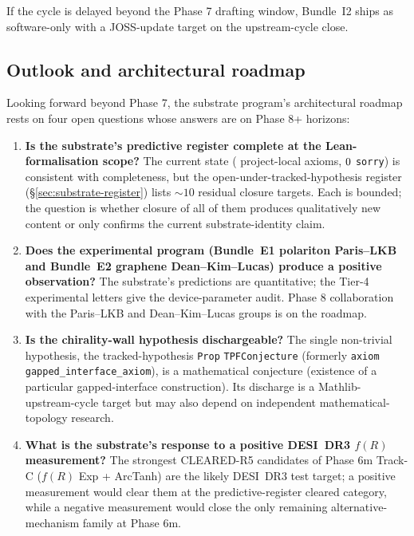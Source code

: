 \documentclass[aps,prd,reprint,nofootinbib,superscriptaddress]{revtex4-2}
\begin{document}
If the cycle is delayed beyond the Phase 7 drafting window, Bundle~I2
ships as software-only with a JOSS-update target on the upstream-cycle
close.

\subsection{Outlook and architectural roadmap}

Looking forward beyond Phase 7, the substrate program's architectural
roadmap rests on four open questions whose answers are on Phase 8+
horizons:

\begin{enumerate}
\item \textbf{Is the substrate's predictive register complete at the
  Lean-formalisation scope?} The current state (\axiomcount{}
  project-local axioms, $0$ \texttt{sorry}) is consistent
  with completeness, but the
  open-under-tracked-hypothesis register
  (\S\ref{sec:substrate-register}) lists $\sim 10$ residual closure
  targets. Each is bounded; the question is whether closure of all of
  them produces qualitatively new content or only confirms the
  current substrate-identity claim.
\item \textbf{Does the experimental program (Bundle~E1 polariton
  Paris--LKB and Bundle~E2 graphene Dean--Kim--Lucas) produce a
  positive observation?} The substrate's predictions are quantitative;
  the Tier-4 experimental letters give the device-parameter audit.
  Phase 8 collaboration with the Paris--LKB and Dean--Kim--Lucas
  groups is on the roadmap.
\item \textbf{Is the chirality-wall hypothesis dischargeable?} The
  single non-trivial hypothesis, the tracked-hypothesis
  \texttt{Prop} \texttt{TPFConjecture} (formerly
  \texttt{axiom gapped\_interface\_axiom}), is a mathematical
  conjecture (existence of a particular gapped-interface
  construction). Its discharge is a Mathlib-upstream-cycle target
  but may also depend on independent mathematical-topology research.
\item \textbf{What is the substrate's response to a positive DESI~DR3
  $f(R)$ measurement?} The strongest CLEARED-R5 candidates of
  Phase 6m Track-C ($f(R)$ Exp + ArcTanh) are the likely DESI~DR3
  test target; a positive measurement would clear them at the
  predictive-register cleared category, while a negative measurement
  would close the only remaining alternative-mechanism family at
  Phase 6m.
\end{enumerate}
\end{document}
